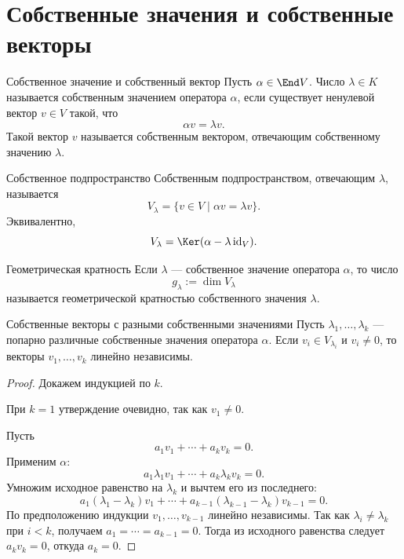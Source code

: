 
\section{Собственные значения и собственные векторы}

\begin{Definition}{Собственное значение и собственный вектор}{}
	Пусть $\alpha\in\End V$.
	Число $\lambda\in K$ называется собственным значением оператора $\alpha$, если существует ненулевой вектор $v\in V$ такой, что
	\[
	\alpha v=\lambda v.
	\]
	Такой вектор $v$ называется собственным вектором, отвечающим собственному значению $\lambda$.
\end{Definition}

\begin{Definition}{Собственное подпространство}{}
	Собственным подпространством, отвечающим $\lambda$, называется
	\[
	V_\lambda=\{v\in V\mid \alpha v=\lambda v\}.
	\]
	Эквивалентно,
	\[
	V_\lambda=\Ker(\alpha-\lambda\operatorname{id}_V).
	\]
\end{Definition}

\begin{Definition}{Геометрическая кратность}{}
	Если $\lambda$ --- собственное значение оператора $\alpha$, то число
	\[
	g_\lambda:=\dim V_\lambda
	\]
	называется геометрической кратностью собственного значения $\lambda$.
\end{Definition}

\begin{Theorem}{Собственные векторы с разными собственными значениями}{}
	Пусть $\lambda_1,\ldots,\lambda_k$ --- попарно различные собственные значения оператора $\alpha$.
	Если $v_i\in V_{\lambda_i}$ и $v_i\ne 0$, то векторы
	$v_1,\ldots,v_k$ линейно независимы.
\end{Theorem}

\begin{proof}
	Докажем индукцией по $k$.
	
	При $k=1$ утверждение очевидно, так как $v_1\ne 0$.
	
	Пусть
	\[
	a_1v_1+\cdots+a_kv_k=0.
	\]
	Применим $\alpha$:
	\[
	a_1\lambda_1v_1+\cdots+a_k\lambda_kv_k=0.
	\]
	Умножим исходное равенство на $\lambda_k$ и вычтем его из последнего:
	\[
	a_1(\lambda_1-\lambda_k)v_1+\cdots+
	a_{k-1}(\lambda_{k-1}-\lambda_k)v_{k-1}=0.
	\]
	По предположению индукции $v_1,\ldots,v_{k-1}$ линейно независимы.
	Так как $\lambda_i\ne\lambda_k$ при $i<k$, получаем
	$a_1=\cdots=a_{k-1}=0$.
	Тогда из исходного равенства следует $a_kv_k=0$, откуда $a_k=0$.
\end{proof}

